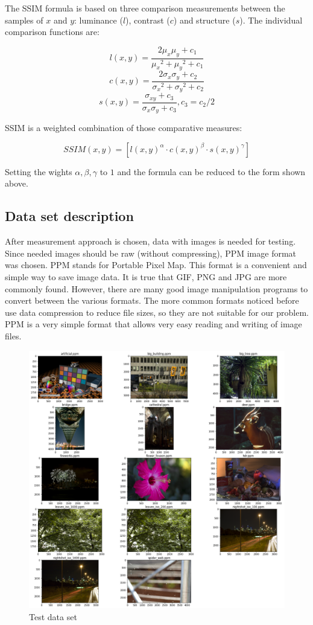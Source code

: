 The SSIM formula is based on three comparison measurements between the samples of $x$ and $y$: luminance ($l$), contrast ($c$) and structure ($s$). The individual comparison functions are:

$$ l(x, y) = \frac{2\mu_x\mu_y + c_1}{{\mu_x}^2 + {\mu_y}^2 + c_1} $$
$$c(x, y) = \frac{2\sigma_x\sigma_y + c_2}{{\sigma_x}^2 + {\sigma_y}^2 + c_2}$$
$$ s(x, y)=\frac{\sigma_{x y} + c_3}{\sigma_x\sigma_y + c_3}, c_3 = c_2 / 2 $$

SSIM is a weighted combination of those comparative measures:

$$SSIM(x,y)=[l(x,y)^\alpha \cdot c(x,y)^\beta \cdot s(x,y)^\gamma]$$

Setting the wights $\alpha, \beta, \gamma$ to $1$ and the formula can be reduced to the form shown above.

\subsection*{Data set description}

After measurement approach is chosen, data with images is needed for testing. Since needed images should be raw (without compressing), PPM image format was chosen. PPM stands for Portable Pixel Map. This format is a convenient and simple way to save image data. It is true that GIF, PNG and JPG are more commonly found. However, there are many good image manipulation programs to convert between the various formats. The more common formats noticed before use data compression to reduce file sizes, so they are not suitable for our problem. PPM is a very simple format that allows very easy reading and writing of image files.

\begin{figure}[H]
  \includegraphics[width=\linewidth]{data_set.png}
  \caption{Test data set}
  
  \label{fig:data_set}
\end{figure}

